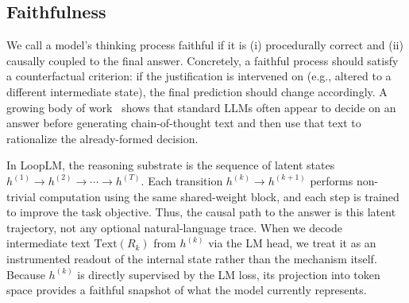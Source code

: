 \documentclass[]{bytedance_seed}
\newcommand{\1}{\mathbf{1}}
\newcommand{\ut}{LoopLM}
\begin{document}
{\subsection{Faithfulness}
We call a model's thinking process faithful if it is (i) procedurally correct and (ii) causally coupled to the final answer. Concretely, a faithful process should satisfy a counterfactual criterion: if the justification is intervened on (e.g., altered to a different intermediate state), the final prediction should change accordingly. A growing body of work~\citep{cox_post_hoc_cot_2024,arcuschin2025chain0of0thought,barez-chain-2025,korbak2025chain} shows that standard LLMs often appear to decide on an answer before generating chain-of-thought text and then use that text to rationalize the already-formed decision.

In \ut{}, the reasoning substrate is the sequence of latent states 
$h^{(1)} \!\rightarrow\! h^{(2)} \!\rightarrow\! \cdots \!\rightarrow\! h^{(T)}$. 
Each transition $h^{(k)} \!\rightarrow\! h^{(k+1)}$ performs non-trivial computation using the same shared-weight block, and each step is trained to improve the task objective. 
Thus, the causal path to the answer is this latent trajectory, not any optional natural-language trace. 
When we decode intermediate text $\text{Text}(R_k)$ from $h^{(k)}$ via the LM head, we treat it as an instrumented readout of the internal state rather than the mechanism itself. 
Because $h^{(k)}$ is directly supervised by the LM loss, its projection into token space provides a faithful snapshot of what the model currently represents.

}
\end{document}
